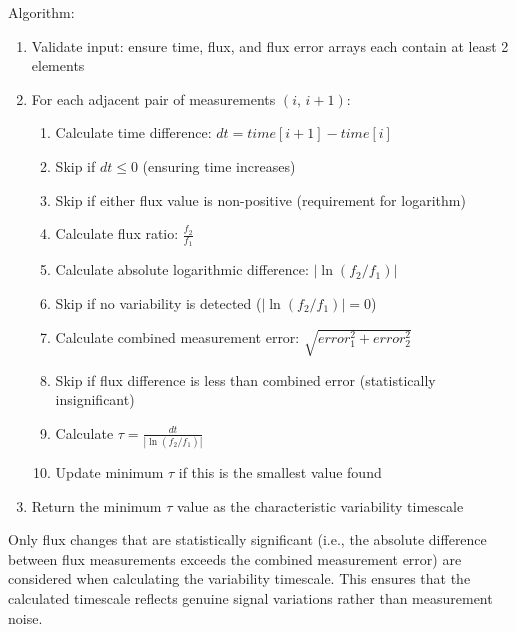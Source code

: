 Algorithm:

\begin{enumerate}
    \item Validate input: ensure time, flux, and flux error arrays each contain at least 2 elements 
    \item For each adjacent pair of measurements $(i,\, i+1)$: 
        \begin{enumerate}
            \item Calculate time difference: $dt = time[i+1] - time[i]$
            \item Skip if $dt \le 0$ (ensuring time increases)
            \item Skip if either flux value is non-positive (requirement for logarithm)
            \item Calculate flux ratio: $\frac{f_2}{f_1}$
            \item Calculate absolute logarithmic difference: $|\ln(f_2/f_1)|$
            \item Skip if no variability is detected ($|\ln(f_2/f_1)| = 0$)
            \item Calculate combined measurement error: $\sqrt{error_1^2 + error_2^2}$
            \item Skip if flux difference is less than combined error (statistically insignificant)
            \item Calculate $\tau = \frac{dt}{|\ln(f_2/f_1)|}$
            \item Update minimum $\tau$ if this is the smallest value found
        \end{enumerate}
    \item Return the minimum $\tau$ value as the characteristic variability timescale
\end{enumerate}

Only flux changes that are statistically significant (i.e., the absolute difference between flux measurements exceeds the combined measurement error) 
are considered when calculating the variability timescale. This ensures that the calculated timescale reflects genuine signal variations rather than measurement noise.\\
